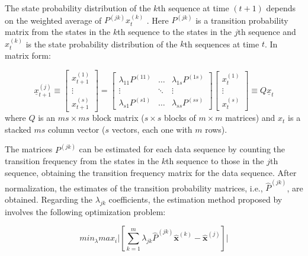 The state probability distribution of the \(k\)th sequence at time \((t + 1)\) depends on the weighted average of \(P^{(jk)}x_{t}^{(k)}\) . Here \(P^{(jk)}\) is a transition probability matrix from the states in the \(k\)th sequence to the states in the \(j\)th sequence and \(x_t^{(k)}\) is the state probability distribution of the \(k\)th sequences at time \(t\). In matrix form:

\begin{equation}
\underline{x}_{t+1}^{(j)} \equiv 
\left[ 
\begin{array}{c}
 x_{t+1}^{(1)} \\
 \vdots \\
 x_{t+1}^{(s)}
\end{array} \right ]
=
\left[ 
\begin{array}{ccc}
\lambda_{11}P^{(11)} & \dots & \lambda_{1s}P^{(1s)}\\
\vdots &  \ddots & \vdots\\
\lambda_{s1}P^{(s1)}& \dots & \lambda_{ss}P^{(ss)}
\end{array} \right ]
\left[ 
\begin{array}{c}
 x_{t}^{(1)} \\
 \vdots \\
 x_{t}^{(s)}
\end{array} \right ]
\equiv
Q \underline{x}_{t}
\label{eq:eq2}
\end{equation} where \(Q\) is an \(ms \times ms\) block matrix (\(s \times s\) blocks of \(m \times m\) matrices) and \(x_t\) is a stacked \(ms\) column vector (\(s\) vectors, each one with \(m\) rows).

The matrices \(P^{(jk)}\) can be estimated for each data sequence by counting the transition frequency from the states in the \(k\)th sequence to those in the \(j\)th sequence, obtaining the transition frequency matrix for the data sequence. After normalization, the estimates of the transition probability matrices, i.e., \(\widehat{P}^{(jk)}\), are obtained. Regarding the \(\lambda_{jk}\) coefficients, the estimation method proposed by \citet{Ching2002} involves the following optimization problem:

\begin{equation}
min_{\lambda} max_{i} \vert [  \sum_{k=1}^m \lambda_{jk} \widehat{P}^{(jk)} \widehat{\boldsymbol{x}}^{(k)} - \widehat{\boldsymbol{x}}^{(j)}  ] \vert
\label{eq:eq3}
\end{equation}

